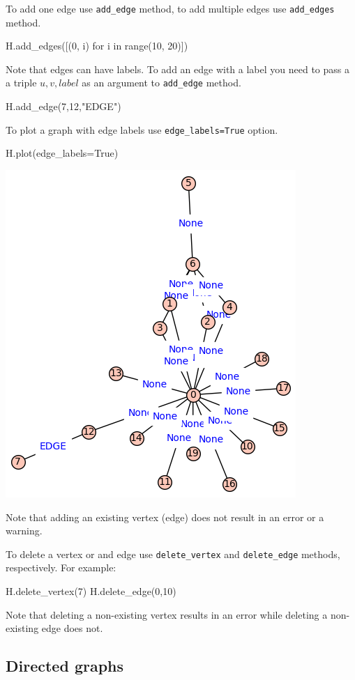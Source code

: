 To add one edge use \verb|add_edge| method, to add multiple edges use \verb|add_edges| method.
\begin{sageCell}
    H.add_edges([(0, i) for i in range(10, 20)])
\end{sageCell}
Note that edges can have labels. To add an edge with a label you need to pass a a triple $u,v,label$ as an argument to \verb|add_edge| method.
\begin{sageCell}
    H.add_edge(7,12,"EDGE")
\end{sageCell}
To plot a graph with edge labels use \verb|edge_labels=True| option.
\begin{sageCell}
    H.plot(edge_labels=True)
\end{sageCell}
\begin{outImage}
    \includegraphics[width=0.5\linewidth]{Images/Introduction/output_add_edge.png}
\end{outImage}
Note that adding an existing vertex (edge) does not result in an error or a warning.

To delete a vertex or and edge use \verb|delete_vertex| and \verb|delete_edge| methods, respectively.
For example:
\begin{sageCell}
    H.delete_vertex(7)
    H.delete_edge(0,10)
\end{sageCell}
Note that deleting a non-existing vertex results in an error while deleting a non-existing edge does not.

\subsection{Directed graphs}


